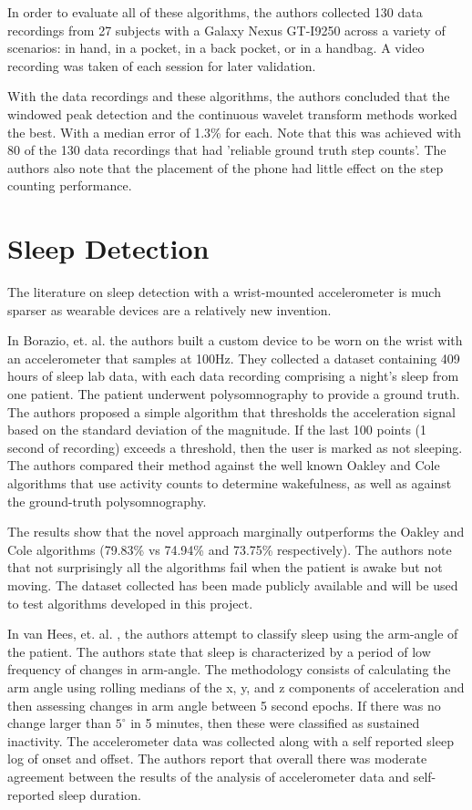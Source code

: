                 In order to evaluate all of these algorithms, the authors collected 130 data recordings from 27 subjects with a Galaxy Nexus GT-I9250 across a variety of scenarios: in hand, in a pocket, in a back pocket, or in a handbag. A video recording was taken of each session for later validation.

                With the data recordings and these algorithms, the authors concluded that the windowed peak detection and the continuous wavelet transform methods worked the best. With a median error of 1.3\% for each. Note that this was achieved with 80 of the 130 data recordings that had 'reliable ground truth step counts'. The authors also note that the placement of the phone had little effect on the step counting performance. 


        \section{Sleep Detection}

            The literature on sleep detection with a wrist-mounted accelerometer is much sparser as wearable devices are a relatively new invention. 

            In Borazio, et. al. \cite{borazio} the authors built a custom device to be worn on the wrist with an accelerometer that samples at 100Hz. They collected a dataset containing 409 hours of sleep lab data, with each data recording comprising a night's sleep from one patient. The patient underwent polysomnography to provide a ground truth. The authors proposed a simple algorithm that thresholds the acceleration signal based on the standard deviation of the magnitude. If the last 100 points (1 second of recording) exceeds a threshold, then the user is marked as not sleeping. The authors compared their method against the well known Oakley \cite{oakley} and Cole \cite{cole} algorithms that use activity counts to determine wakefulness, as well as against the ground-truth polysomnography. 

            The results show that the novel approach marginally outperforms the Oakley and Cole algorithms (79.83\% vs 74.94\% and 73.75\% respectively). The authors note that not surprisingly all the algorithms fail when the patient is awake but not moving. The dataset collected has been made publicly available and will be used to test algorithms developed in this project.

            In van Hees, et. al. \cite{vanhees}, the authors attempt to classify sleep using the arm-angle of the patient. The authors state that sleep is characterized by a period of low frequency of changes in arm-angle. The methodology consists of calculating the arm angle using rolling medians of the x, y, and z components of acceleration and then assessing changes in arm angle between 5 second epochs. If there was no change larger than $5^{\circ}$ in 5 minutes, then these were classified as sustained inactivity. The accelerometer data was collected along with a self reported sleep log of onset and offset. The authors report that overall there was moderate agreement between the results of the analysis of accelerometer data and self-reported sleep duration.